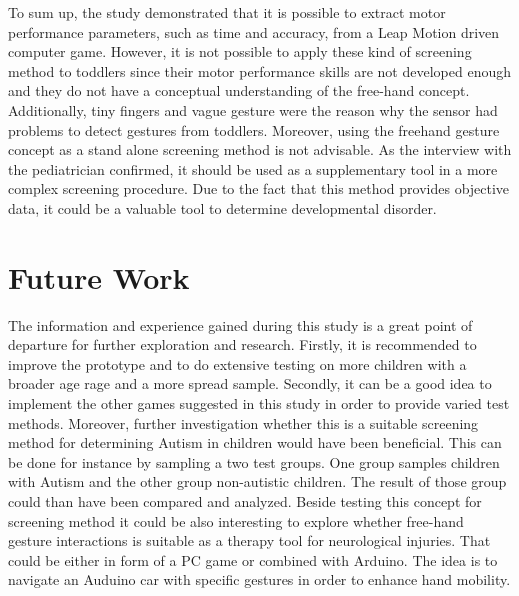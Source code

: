 To sum up, the study demonstrated that it is possible to extract motor performance parameters, such as time and accuracy, from a Leap Motion driven computer game. However, it is not possible to apply these kind of screening method to toddlers since their motor performance skills are not developed enough and they do not have a conceptual understanding of the free-hand concept. Additionally, tiny fingers and vague gesture were the reason why the sensor had problems to detect gestures from toddlers.
Moreover, using the freehand gesture concept as a stand alone screening method is not advisable. As the interview with the pediatrician confirmed, it should be used as a supplementary tool in a more complex screening procedure. Due to the fact that this method provides objective data, it could be a valuable tool to determine developmental disorder.  



\section{Future Work}
\label{sec:future}


The information and experience gained during this study is a great point of departure for further exploration and research.  
Firstly, it is recommended to improve the prototype and to do extensive testing on more children with a broader age rage and a more spread sample. Secondly, it can be a good idea to implement the other games suggested in this study in order to provide varied test methods.
Moreover, further investigation whether this is a suitable screening method for determining Autism in children would have been beneficial. This can be done for instance by sampling a two test groups. One group samples children with Autism and the other group non-autistic children. The result of those group could than have been compared and analyzed. 
Beside testing this concept for screening method it could be also interesting to explore whether free-hand gesture interactions is suitable as a therapy tool for neurological injuries. That could be either in form of a PC game or combined with Arduino. The idea is to navigate an Auduino car with specific gestures in order to enhance hand mobility.  




